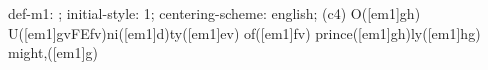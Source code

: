 def-m1: \grealign;
initial-style: 1;
centering-scheme: english;
(c4) O([em1]gh) U([em1]gvFEfv)ni([em1]d)ty([em1]ev) of([em1]fv) prince([em1]gh)ly([em1]hg) might,([em1]g)